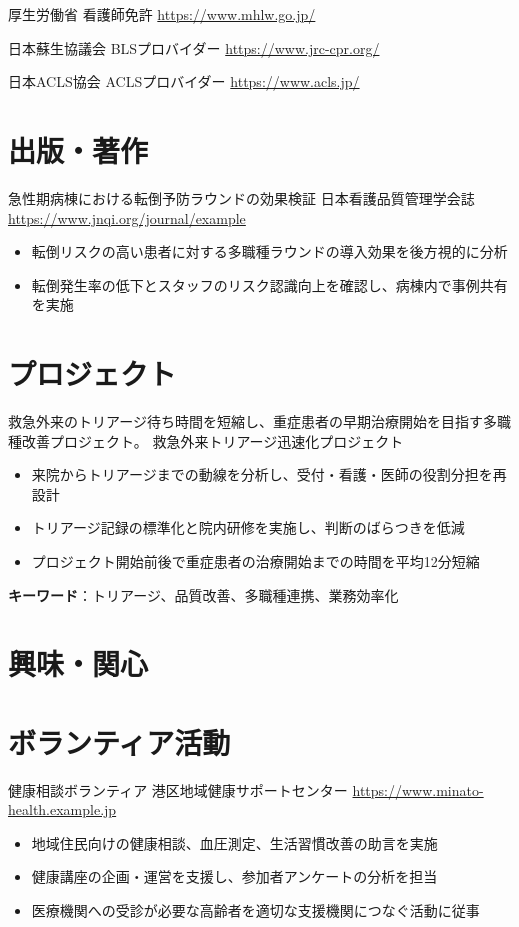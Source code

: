 \documentclass[a4paper, serif, 10pt]{moderncv}
\begin{document}
        {厚生労働省}
        {看護師免許}
        {\url{https://www.mhlw.go.jp/}}
        {}
        {}

        {日本蘇生協議会}
        {BLSプロバイダー}
        {\url{https://www.jrc-cpr.org/}}
        {}
        {}

        {日本ACLS協会}
        {ACLSプロバイダー}
        {\url{https://www.acls.jp/}}
        {}
        {}
\section{出版・著作}

        {急性期病棟における転倒予防ラウンドの効果検証}
        {日本看護品質管理学会誌}
        {\url{https://www.jnqi.org/journal/example}}
        {}
        {\begin{itemize}
\item 転倒リスクの高い患者に対する多職種ラウンドの導入効果を後方視的に分析
\item 転倒発生率の低下とスタッフのリスク認識向上を確認し、病棟内で事例共有を実施
\end{itemize}}
\section{プロジェクト}

        {救急外来のトリアージ待ち時間を短縮し、重症患者の早期治療開始を目指す多職種改善プロジェクト。}
        {救急外来トリアージ迅速化プロジェクト}
        {}
        {}
        {\begin{itemize}
\item 来院からトリアージまでの動線を分析し、受付・看護・医師の役割分担を再設計
\item トリアージ記録の標準化と院内研修を実施し、判断のばらつきを低減
\item プロジェクト開始前後で重症患者の治療開始までの時間を平均12分短縮
\end{itemize}
\textbf{キーワード}：トリアージ、品質改善、多職種連携、業務効率化}
\section{興味・関心}

\section{ボランティア活動}

        {健康相談ボランティア}
        {港区地域健康サポートセンター}
        {\url{https://www.minato-health.example.jp}}
        {}
        {\begin{itemize}
\item 地域住民向けの健康相談、血圧測定、生活習慣改善の助言を実施
\item 健康講座の企画・運営を支援し、参加者アンケートの分析を担当
\item 医療機関への受診が必要な高齢者を適切な支援機関につなぐ活動に従事
\end{itemize}}
    
\end{document}

